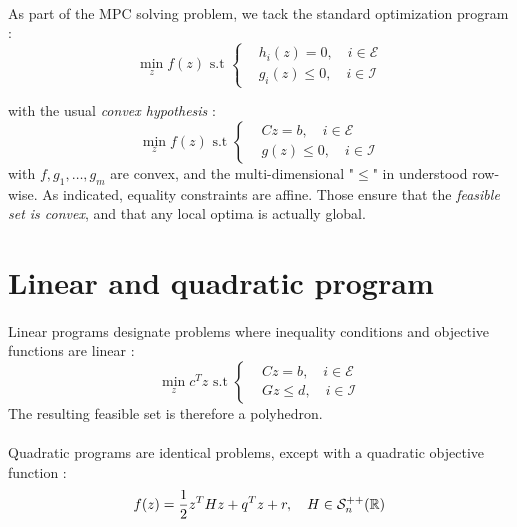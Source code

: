 \documentclass[a4paper]{article}
\begin{document}
	
	\paragraph{} As part of the MPC solving problem, we tack the standard optimization program : 
	\begin{equation}
		\min_z f(z) \text{ s.t } \left\{ \begin{aligned} &h_i(z) = 0, \quad i\in\mathcal{E} \\ &g_i(z) \leq 0 , \quad i\in\mathcal{I} \end{aligned}\right.
	\end{equation}
	
	with the usual \emph{convex hypothesis} : 
	\begin{equation}
		\min_z f(z) \text{ s.t } \left\{ \begin{aligned} &Cz= b, \quad i\in\mathcal{E} \\ &g(z) \leq 0 , \quad i\in\mathcal{I} \end{aligned}\right.
	\end{equation}
	with $f, g_1,\hdots, g_m$ are convex, and the multi-dimensional "$\leq$" in understood row-wise. As indicated, equality constraints are affine. Those ensure that the \emph{feasible set is convex}, and that any local optima is actually global. 
	
	\section{Linear and quadratic program}
	{
		\paragraph{} Linear programs designate problems where inequality conditions and objective functions are linear : 
		\begin{equation}
			\min_z c^Tz \text{ s.t } \left\{ \begin{aligned} &Cz= b, \quad i\in\mathcal{E} \\ &Gz \leq d , \quad i\in\mathcal{I} \end{aligned}\right.
		\end{equation}
		The resulting feasible set is therefore a polyhedron. 
		
		\paragraph{} Quadratic programs are identical problems, except with a quadratic objective function : 
		\begin{equation}
			f(z) = \frac{1}{2} z^T H z + q^T z + r, \quad H\in\mathcal{S}_n^{++}(\mathbb{R}) \\
		\end{equation}
	}
		
\end{document}
